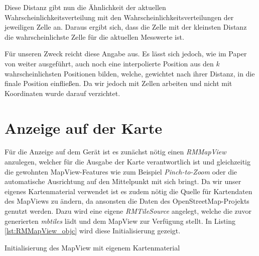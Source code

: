 Diese Distanz gibt nun die Ähnlichkeit der aktuellen Wahrscheinlichkeitsverteilung mit den Wahrscheinlichkeitsverteilungen der jeweiligen Zelle an. Daraus ergibt sich, dass die Zelle mit der kleinsten Distanz die wahrscheinlichste Zelle für die aktuellen Messwerte ist.

Für unseren Zweck reicht diese Angabe aus. Es lässt sich jedoch, wie im Paper von \citet{wifiFingerprintProbability} weiter ausgeführt, auch noch eine interpolierte Position aus den $k$ wahrscheinlichsten Positionen bilden, welche, gewichtet nach ihrer Distanz, in die finale Position einfließen. Da wir jedoch mit Zellen arbeiten und nicht mit Koordinaten wurde darauf verzichtet. 


\section{Anzeige auf der Karte}
\label{sec:map}

Für die Anzeige auf dem Gerät ist es zunächst nötig einen \emph{RMMapView} anzulegen, welcher für die Ausgabe der Karte verantwortlich ist und gleichzeitig die gewohnten MapView-Features wie zum Beispiel \emph{Pinch-to-Zoom} oder die automatische Ausrichtung auf den Mittelpunkt mit sich bringt.
Da wir unser eigenes Kartenmaterial verwendet ist es zudem nötig die Quelle für Kartendaten des MapViews zu ändern, da ansonsten die Daten des OpenStreetMap-Projekts genutzt werden. Dazu wird eine eigene \emph{RMTileSource} angelegt, welche die zuvor generierten \emph{mbtiles} lädt und dem MapView zur Verfügung stellt. 
In Listing \ref{lst:RMMapView_objc} wird diese Initialisierung gezeigt.
\begin{listing}[htb!]
    \caption{Initialisierung des MapView mit eigenem Kartenmaterial}
	\label{lst:RMMapView_objc}
\end{listing}